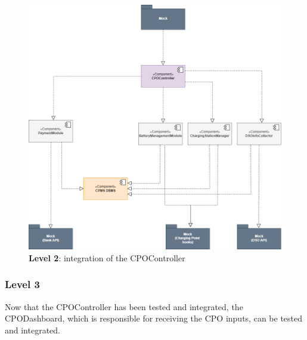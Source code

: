 \documentclass[12pt]{report}
\begin{document}
\bigskip
\begin{figure}[ht]
    \centering
    \includegraphics[width=\textwidth]{assets/level2_CPMS_integration.png}
    \caption{\textbf{Level 2}: integration of the CPOController}
    \label{fig:my_label42366633133223}
\end{figure}
\clearpage

\subsubsection{Level 3}
Now that the CPOController has been tested and integrated, the CPODashboard, which is responsible for receiving the CPO inputs, can be tested and integrated.
\end{document}
